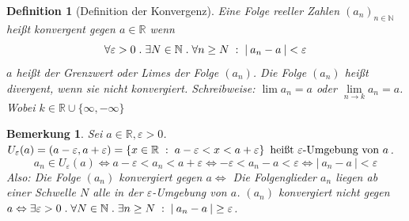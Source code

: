 \documentclass[a4paper,titlepage,oneside]{article}
\def\N{\ensuremath{\mathbb{N}} }
\def\R{\ensuremath{\mathbb{R}} }
\renewcommand{\epsilon}{\ensuremath{\varepsilon} }
\def\sp{\hspace{0,1cm}}
\def\spdot{\sp.\sp}
\def\spcolon{\sp:\sp}
\newcommand{\abs}[1]{\ensuremath{\left|\:#1\:\right|}}
\newcommand{\menge}[2]{\ensuremath{\left\{#1\sp : \sp #2\right\}}}
\theoremstyle{thmstyle}
\newtheorem{defi}[satz]{Definition}
\newtheorem{bem}[satz]{Bemerkung}
\theoremstyle{subthmstyle}
\begin{document}
\begin{defi}[Definition der Konvergenz]
Eine Folge reeller Zahlen \((a_n)_{n\in\N}\) heißt konvergent gegen \( a\in\R\) wenn
\[\forall \epsilon > 0 \spdot \exists N \in \N \spdot \forall n \ge N \spcolon \abs{a_n - a} < \epsilon\]
\(a\) heißt der Grenzwert oder Limes der Folge \((a_n)\). Die Folge \((a_n)\) heißt divergent, wenn sie nicht konvergiert. Schreibweise: \(\lim{a_n} = a \) oder \( \lim\limits_{n \to k}{a_n} = a \). Wobei \( k \in \R\cup\{\infty, -\infty\}\)
\end{defi}

\begin{bem}
Sei \(a \in \R, \epsilon > 0\). \(U_\epsilon(a) = (a-\epsilon, a+\epsilon) = \menge{x \in \R}{a - \epsilon < x < a + \epsilon} \text{ heißt } \epsilon\text{-Umgebung von }a\).
\[ a_n \in U_\epsilon(a) \Leftrightarrow a-\epsilon < a_n < a + \epsilon \Leftrightarrow -\epsilon < a_n - a < \epsilon \Leftrightarrow \abs{a_n - a} < \epsilon\]
Also: Die Folge \((a_n)\) konvergiert gegen \(a \Leftrightarrow \) Die Folgenglieder \(a_n\) liegen ab einer Schwelle \(N\) alle in der \(\epsilon\)-Umgebung von \(a\). \((a_n)\) konvergiert nicht gegen \(a \Leftrightarrow \exists \epsilon > 0 \spdot \forall N\in\N \spdot \exists n \ge N \spcolon \abs{a_n - a} \ge \epsilon\).
\end{bem}
\end{document}
